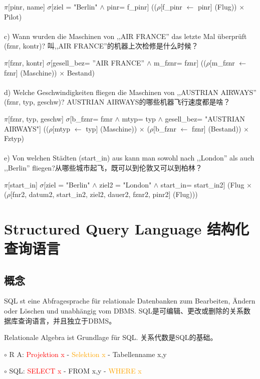 \documentclass[fleqn]{article}
\begin{document}
$\pi$[pinr, name] $\sigma$[ziel = "Berlin" $\wedge$ pinr= f\_pinr] (($\rho$[f\_pinr $\leftarrow$ pinr] (Flug)) $\times$ Pilot)
\\
\\
\noindent c) Wann wurden die Maschinen von ,,AIR FRANCE'' das letzte Mal überprüft (fznr, kontr)? 叫,,AIR FRANCE''的机器上次检修是什么时候？

$\pi$[fznr, kontr] $\sigma$[gesell\_bez= ''AIR FRANCE'' $\wedge$ m\_fznr= fznr] (($\rho$[m\_fznr $\leftarrow$ fznr]   (Maschine)) $\times$ Bestand)
\\
\\
\noindent d) Welche Geschwindigkeiten fliegen die Maschinen von ,,AUSTRIAN AIRWAYS'' (fznr, typ, geschw)? AUSTRIAN AIRWAYS的哪些机器飞行速度都是啥？ 

$\pi$[fznr, typ, geschw] $\sigma$[b\_fznr= fznr $\wedge$ mtyp= typ $\wedge$ gesell\_bez= "AUSTRIAN AIRWAYS"]  (($\rho$[mtyp $\leftarrow$ typ] (Maschine)) $\times$ ($\rho$[b\_fznr $\leftarrow$ fznr] (Bestand)) $\times$ Fztyp)
\\
\\
\noindent e) Von welchen Städten (start\_in) aus kann man sowohl nach ,,London'' als auch ,,Berlin'' fliegen?从哪些城市起飞，既可以到伦敦又可以到柏林？

$\pi$[start\_in] $\sigma$[ziel = "Berlin" $\wedge$ ziel2 = "London" $\wedge$ start\_in= start\_in2] (Flug $\times$ ($\rho$[fnr2,  datum2, start\_in2, ziel2, dauer2, fznr2, pinr2] (Flug)))

\section{Structured Query Language 结构化查询语言}

\subsection{概念}

\noindent SQL st eine Abfragesprache für relationale Datenbanken zum  Bearbeiten, Ändern oder Löschen und unabhängig vom DBMS. SQL是可编辑、更改或删除的关系数据库查询语言，并且独立于DBMS。

\noindent Relationale Algebra ist Grundlage für SQL. 关系代数是SQL的基础。

\noindent $\circ$ R A: \textcolor{red}{Projektion x} - \textcolor{orange}{Selektion x} \qquad - \textcolor[RGB]{84,139,84}{Tabellenname x,y}

\noindent $\circ$ SQL: \textcolor{red}{SELECT x} - \textcolor[RGB]{84,139,84}{FROM x,y} \qquad - \textcolor{orange}{WHERE x}
\end{document}
